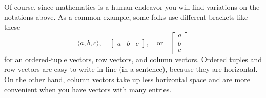 \documentclass{ximera}
\begin{document}
\begin{concept}
\begin{description}
  \begin{center}
    \colorbox[rgb]{0.624, 0.886, 0.749}{%
      \parbox{1cm}{\rule{0pt}{1cm}}}
  \end{center}
\end{description}
\end{concept}

Of course, since mathematics is a human endeavor you will find
variations on the notations above. As a common example, some folks use
different brackets like these
\[
\langle a, b, c\rangle, \quad \begin{bmatrix} a & b & c \end{bmatrix}, \quad \text{or}\quad
\begin{bmatrix}
  a\\
  b\\
  c
\end{bmatrix}
\]
for an ordered-tuple vectors, row vectors, and column vectors. Ordered
tuples and row vectors are easy to write in-line (in a sentence),
because they are horizontal. On the other hand, column vectors take up
less horizontal space and are more convenient when you have vectors
with many entries.
\end{document}
